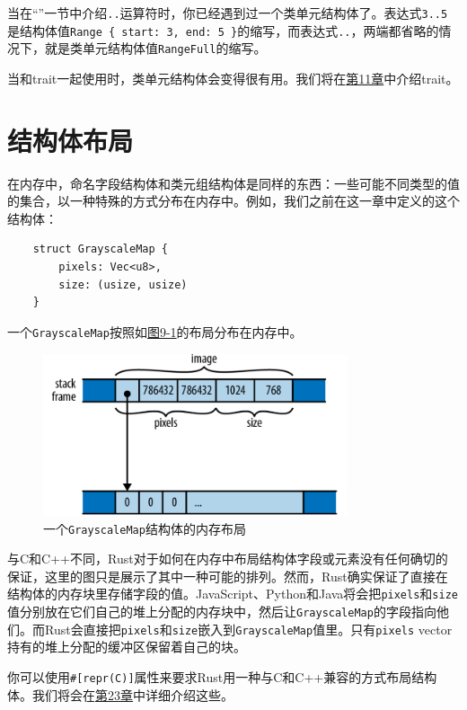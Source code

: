 当在“”一节中介绍\texttt{..}运算符时，你已经遇到过一个类单元结构体了。表达式\texttt{3..5}是结构体值\texttt{Range \{ start: 3, end: 5 \}}的缩写，而表达式\texttt{..}，两端都省略的情况下，就是类单元结构体值\texttt{RangeFull}的缩写。

当和trait一起使用时，类单元结构体会变得很有用。我们将在\hyperref[ch11]{第11章}中介绍trait。

\section{结构体布局}

在内存中，命名字段结构体和类元组结构体是同样的东西：一些可能不同类型的值的集合，以一种特殊的方式分布在内存中。例如，我们之前在这一章中定义的这个结构体：
\begin{verbatim}
    struct GrayscaleMap {
        pixels: Vec<u8>,
        size: (usize, usize)
    }
\end{verbatim}

一个\texttt{GrayscaleMap}按照如\hyperref[f9-1]{图9-1}的布局分布在内存中。

\begin{figure}[htbp]
    \centering
    \includegraphics[width=0.8\textwidth]{../img/f9-1.png}
    \caption{一个\texttt{GrayscaleMap}结构体的内存布局}
    \label{f9-1}
\end{figure}

与C和C++不同，Rust对于如何在内存中布局结构体字段或元素没有任何确切的保证，这里的图只是展示了其中一种可能的排列。然而，Rust确实保证了直接在结构体的内存块里存储字段的值。JavaScript、Python和Java将会把\texttt{pixels}和\texttt{size}值分别放在它们自己的堆上分配的内存块中，然后让\texttt{GrayscaleMap}的字段指向他们。而Rust会直接把\texttt{pixels}和\texttt{size}嵌入到\texttt{GrayscaleMap}值里。只有\texttt{pixels} vector持有的堆上分配的缓冲区保留着自己的块。

你可以使用\texttt{\#[repr(C)]}属性来要求Rust用一种与C和C++兼容的方式布局结构体。我们将会在\hyperref[ch23]{第23章}中详细介绍这些。

